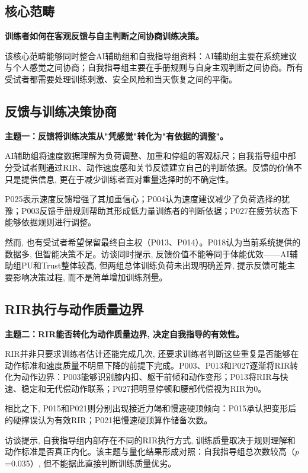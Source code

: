 \subsection{核心范畴}

\textbf{训练者如何在客观反馈与自主判断之间协商训练决策。}

该核心范畴能够同时整合AI辅助组和自我指导组资料：AI辅助组主要在系统建议与个人感觉之间协商；自我指导组主要在手册规则与自身主观判断之间协商。所有受试者都需要处理训练刺激、安全风险和当天恢复之间的平衡。

\subsection{反馈与训练决策协商}
\label{sec:feedback_decision}

\textbf{主题一：反馈将训练决策从"凭感觉"转化为"有依据的调整"。}

AI辅助组将速度数据理解为负荷调整、加重和停组的客观标尺；自我指导组中部分受试者则通过RIR、动作速度感和关节反馈建立自己的判断依据。反馈的价值不只是提供信息, 更在于减少训练者面对重量选择时的不确定性。

P025表示速度反馈增强了其加重信心；P004认为速度建议减少了负荷选择的犹豫；P003反馈手册规则帮助其形成低力量训练者的判断依据；P027在疲劳状态下能够依据规则进行调整。

然而, 也有受试者希望保留最终自主权（P013、P014）。P018认为当前系统提供的数据多, 但智能决策不足。访谈同时提示, 反馈价值不能等同于体能优效——AI辅助组PU和Trust整体较高, 但两组总体训练负荷未出现明确差异, 提示反馈可能主要影响决策过程, 而不是简单增加训练剂量。

\subsection{RIR执行与动作质量边界}
\label{sec:rir_quality}

\textbf{主题二：RIR能否转化为动作质量边界, 决定自我指导的有效性。}

RIR并非只要求训练者估计还能完成几次, 还要求训练者判断这些重复是否能够在动作标准和速度质量不明显下降的前提下完成。P003、P013和P027逐渐将RIR转化为动作边界：P003能够识别膝内扣、躯干前倾和动作变形；P013将RIR与快速、稳定和无代偿动作联系；P027把明显停顿和腰部代偿视为RIR为0。

相比之下, P015和P021则分别出现接近力竭和慢速硬顶倾向：P015承认把变形后的硬撑误认为有效RIR；P021把慢速硬顶算作储备次数。

访谈提示, 自我指导组内部存在不同的RIR执行方式, 训练质量取决于规则理解和动作标准是否真正内化。该主题与量化结果形成对照：自我指导组总次数较高（$p$=0.035）, 但不能据此直接判断训练质量优劣。

